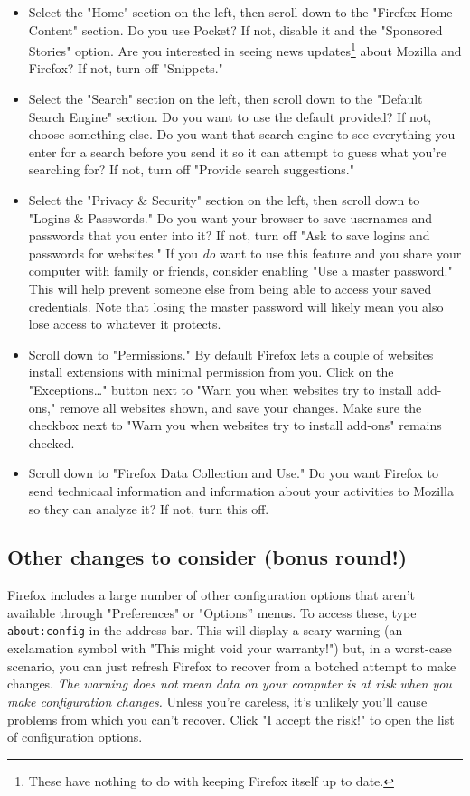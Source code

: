 \documentclass{tufte-handout}
\begin{document}
\begin{itemize}
	\item Select the "Home" section on the left, then scroll down to the "Firefox Home Content" section.  Do you use Pocket?  If not, disable it and the "Sponsored Stories" option.  Are you interested in seeing news updates\footnote{These have nothing to do with keeping Firefox itself up to date.} about Mozilla and Firefox?  If not, turn off "Snippets."

	\item Select the "Search" section on the left, then scroll down to the "Default Search Engine" section.  Do you want to use the default provided?  If not, choose something else.  Do you want that search engine to see everything you enter for a search before you send it so it can attempt to guess what you're searching for?  If not, turn off "Provide search suggestions."

	\item Select the "Privacy \& Security" section on the left, then scroll down to "Logins \& Passwords."  Do you want your browser to save usernames and passwords that you enter into it?  If not, turn off "Ask to save logins and passwords for websites."  If you \emph{do} want to use this feature and you share your computer with family or friends, consider enabling "Use a master password."  This will help prevent someone else from being able to access your saved credentials.  Note that losing the master password will likely mean you also lose access to whatever it protects.

	\item Scroll down to "Permissions."  By default Firefox lets a couple of websites install extensions with minimal permission from you.  Click on the "Exceptions\ldots{}" button next to "Warn you when websites try to install add-ons," remove all websites shown, and save your changes.  Make sure the checkbox next to "Warn you when websites try to install add-ons" remains checked.

	\item Scroll down to "Firefox Data Collection and Use."  Do you want Firefox to send technicaal information and information about your activities to Mozilla so they can analyze it?  If not, turn this off.
\end{itemize}



\subsection{Other changes to consider (bonus round!)}
Firefox includes a large number of other configuration options that aren't available through "Preferences" or "Options'' menus.  To access these, type \texttt{about:config} in the address bar.  This will display a scary warning (an exclamation symbol with "This might void your warranty!") but, in a worst-case scenario, you can just refresh Firefox to recover from a botched attempt to make changes.  \emph{The warning does not mean data on your computer is at risk when you make configuration changes.}  Unless you're careless, it's unlikely you'll cause problems from which you can't recover.  Click "I accept the risk!" to open the list of configuration options.
\end{document}
